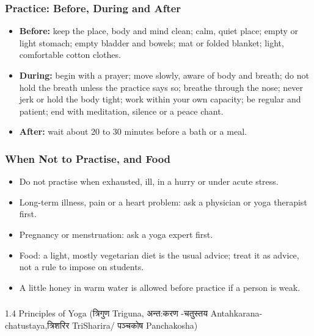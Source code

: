 \begin{frame}[fragile]\frametitle{Practice: Before, During and After}

    \begin{itemize}
        \item \textbf{Before:} keep the place, body and mind clean; calm, quiet place; empty or light stomach; empty bladder and bowels; mat or folded blanket; light, comfortable cotton clothes.
        \item \textbf{During:} begin with a prayer; move slowly, aware of body and breath; do not hold the breath unless the practice says so; breathe through the nose; never jerk or hold the body tight; work within your own capacity; be regular and patient; end with meditation, silence or a peace chant.
        \item \textbf{After:} wait about 20 to 30 minutes before a bath or a meal.
    \end{itemize}

\end{frame}

\begin{frame}[fragile]\frametitle{When Not to Practise, and Food}

    \begin{itemize}
        \item Do not practise when exhausted, ill, in a hurry or under acute stress.
        \item Long-term illness, pain or a heart problem: ask a physician or yoga therapist first.
        \item Pregnancy or menstruation: ask a yoga expert first.
        \item Food: a light, mostly vegetarian diet is the usual advice; treat it as advice, not a rule to impose on students.
        \item A little honey in warm water is allowed before practice if a person is weak.
    \end{itemize}

\end{frame}


\begin{frame}[fragile]\frametitle{}
\begin{center}
{\Large 1.4 Principles of Yoga (त्रिगुण Triguna, अन्त:करण -चतुस्तय Antahkarana-chatustaya,त्रिशरिर  TriSharira/  पञ्चकोष Panchakosha)}
\end{center}
\end{frame}


